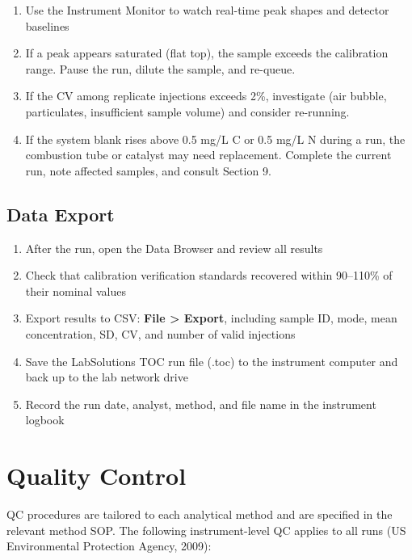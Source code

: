 \documentclass[
  11pt,
  letterpaper,
]{article}
\providecommand{\tightlist}{%
  \setlength{\itemsep}{0pt}\setlength{\parskip}{0pt}}
\begin{document}
\begin{enumerate}
\def\labelenumi{\arabic{enumi}.}
\tightlist
\item
  Use the Instrument Monitor to watch real-time peak shapes and detector
  baselines
\item
  If a peak appears saturated (flat top), the sample exceeds the
  calibration range. Pause the run, dilute the sample, and re-queue.
\item
  If the CV among replicate injections exceeds 2\%, investigate (air
  bubble, particulates, insufficient sample volume) and consider
  re-running.
\item
  If the system blank rises above 0.5 mg/L C or 0.5 mg/L N during a run,
  the combustion tube or catalyst may need replacement. Complete the
  current run, note affected samples, and consult Section 9.
\end{enumerate}

\subsection{Data Export}\label{data-export}

\begin{enumerate}
\def\labelenumi{\arabic{enumi}.}
\tightlist
\item
  After the run, open the Data Browser and review all results
\item
  Check that calibration verification standards recovered within
  90--110\% of their nominal values
\item
  Export results to CSV: \textbf{File \textgreater{} Export}, including
  sample ID, mode, mean concentration, SD, CV, and number of valid
  injections
\item
  Save the LabSolutions TOC run file (.toc) to the instrument computer
  and back up to the lab network drive
\item
  Record the run date, analyst, method, and file name in the instrument
  logbook
\end{enumerate}

\section{Quality Control}\label{quality-control}

QC procedures are tailored to each analytical method and are specified
in the relevant method SOP. The following instrument-level QC applies to
all runs (US Environmental Protection Agency, 2009):
\end{document}
